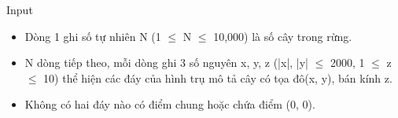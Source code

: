 Input
\begin{itemize}
	\item Dòng 1 ghi số tự nhiên N (1  $\le$  N  $\le$  10,000) là số cây trong rừng.
	\item N dòng tiếp theo, mỗi dòng ghi 3 số nguyên x, y, z (|x|, |y|  $\le$  2000, 1  $\le$  z  $\le$  10) thể hiện các đáy của hình trụ mô tả cây có tọa đô(x, y), bán kính z.
	\item Không có hai đáy nào có điểm chung hoặc chứa điểm (0, 0).
\end{itemize}
